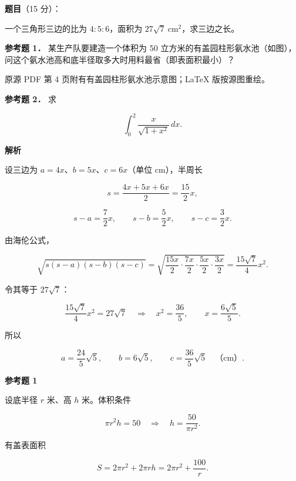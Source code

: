 \begin{answer}

\textbf{题目}（15 分）：

一个三角形三边的比为 $4:5:6$，面积为 $27\sqrt7\ \mathrm{cm^2}$，求三边之长。

\textbf{参考题 1．} 某生产队要建造一个体积为 50 立方米的有盖园柱形氨水池（如图），问这个氨水池高和底半径取多大时用料最省（即表面积最小）？

\begin{gktip}
原源 PDF 第 4 页附有有盖园柱形氨水池示意图；LaTeX 版按源图重绘。
\end{gktip}
\nopagebreak[4]
\begin{center}\end{center}
\nopagebreak[4]
\textbf{参考题 2．} 求

\nopagebreak[4]
\[
\int_0^2\frac{x}{\sqrt{1+x^2}}\,dx.
\]

\textbf{解析}

设三边为 $a=4x$、$b=5x$、$c=6x$（单位 cm），半周长

\nopagebreak[4]
\[
s=\frac{4x+5x+6x}{2}=\frac{15}{2}x,
\]

\nopagebreak[4]
\[
s-a=\frac{7}{2}x,\qquad
s-b=\frac{5}{2}x,\qquad
s-c=\frac{3}{2}x.
\]

由海伦公式，

\nopagebreak[4]
\[
\sqrt{s(s-a)(s-b)(s-c)}
=\sqrt{\frac{15x}{2}\cdot\frac{7x}{2}\cdot\frac{5x}{2}\cdot\frac{3x}{2}}
=\frac{15\sqrt7}{4}x^{2}.
\]

令其等于 $27\sqrt7$：

\nopagebreak[4]
\[
\frac{15\sqrt7}{4}x^{2}=27\sqrt7
\quad\Longrightarrow\quad
x^{2}=\frac{36}{5},
\qquad
x=\frac{6\sqrt5}{5}.
\]

所以

\nopagebreak[4]
\[
a=\frac{24}{5}\sqrt5,\qquad
b=6\sqrt5,\qquad
c=\frac{36}{5}\sqrt5
\quad\text{（cm）}.
\]

\textbf{参考题 1}

设底半径 $r$ 米、高 $h$ 米。体积条件

\nopagebreak[4]
\[
\pi r^{2}h=50
\quad\Longrightarrow\quad
h=\frac{50}{\pi r^{2}}.
\]

有盖表面积

\nopagebreak[4]
\[
S=2\pi r^{2}+2\pi rh
=2\pi r^{2}+\frac{100}{r}.
\]


\end{answer}
